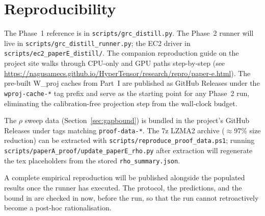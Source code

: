 \documentclass[11pt]{article}
\begin{document}
\section{Reproducibility}
\label{sec:repro}

The Phase~1 reference is in \texttt{scripts/grc\_distill.py}. The
Phase~2 runner will live in \texttt{scripts/grc\_distill\_runner.py};
the EC2 driver in \texttt{scripts/ec2\_paperE\_distill/}. The companion
reproduction guide on the project site walks through CPU-only and GPU
paths step-by-step (see
\url{https://nagusamecs.github.io/HyperTensor/research/repro/paper-e.html}).
The pre-built W\_proj caches from Part~I are published as GitHub
Releases under the \texttt{wproj-cache-*} tag prefix and serve as the
starting point for any Phase~2 run, eliminating the calibration-free
projection step from the wall-clock budget.

The $\rho$ sweep data (Section~\ref{sec:gapbound}) is bundled in the
project's GitHub Releases under tags matching \texttt{proof-data-*}.
The 7z LZMA2 archive ($\approx$97\% size reduction) can be extracted with
\texttt{scripts/reproduce\_proof\_data.ps1}; running
\texttt{scripts/paperA\_proof/update\_paperE\_rho.py} after extraction
will regenerate the tex placeholders from the stored
\texttt{rho\_summary.json}.

A complete empirical reproduction will be published alongside the
populated results once the runner has executed. The protocol, the
predictions, and the bound in  are checked in now,
before the run, so that the run cannot retroactively become a
post-hoc rationalisation.

\printbibliography
\end{document}
